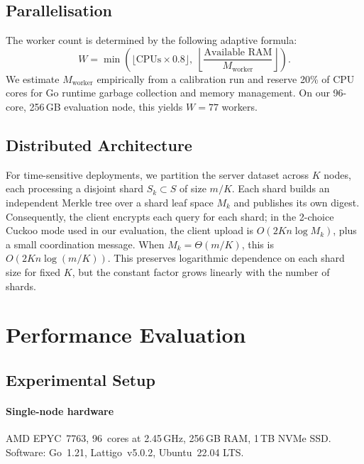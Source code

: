 \documentclass[preprint,12pt]{elsarticle}
\begin{document}
\subsection{Parallelisation}

The worker count is determined by the following adaptive formula:
\[
  W = \min\!\left(\lfloor \text{CPUs} \times 0.8 \rfloor,\;
  \left\lfloor \frac{\text{Available RAM}}{M_{\text{worker}}} \right\rfloor\right).
\]
We estimate $M_{\text{worker}}$ empirically from a calibration run and reserve 20\% of CPU cores for Go runtime garbage collection and memory
management. On our 96-core, 256\,GB evaluation node, this yields $W = 77$
workers.

\subsection{Distributed Architecture}

For time-sensitive deployments, we partition the server dataset across $K$
nodes, each processing a disjoint shard $S_k \subset S$ of size $m/K$. Each
shard builds an independent Merkle tree over a shard leaf space $M_k$ and
publishes its own digest. Consequently, the client encrypts each query for
each shard; in the 2-choice Cuckoo mode used in our evaluation, the client
upload is $O(2K n \log M_k)$, plus a small coordination message. When
$M_k=\Theta(m/K)$, this is $O(2K n \log(m/K))$. This preserves logarithmic
dependence on each shard size for fixed $K$, but the constant factor grows
linearly with the number of shards.

\section{Performance Evaluation}
\label{sec:eval}

\subsection{Experimental Setup}

\paragraph{Single-node hardware}
AMD EPYC~7763, 96~cores at 2.45\,GHz, 256\,GB RAM, 1\,TB NVMe SSD.
Software: Go~1.21, Lattigo~v5.0.2, Ubuntu~22.04 LTS.
\end{document}
